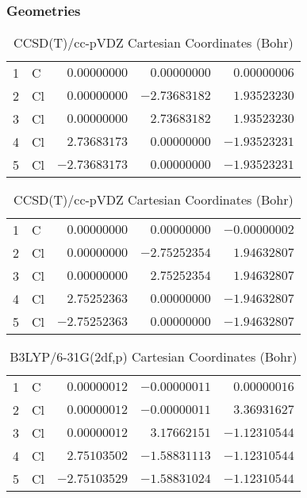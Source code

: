 \documentclass[10pt,oneside]{article}
\begin{document}
\clearpage

\subsection{}

\begin{table}[h!]
\subsubsection*{Geometries}
\begin{multicols}{2}
\centering
\caption{CCSD(T)/cc-pVTZ Cartesian Coordinates (Bohr)}
\begin{tabular}{llrrr}
\toprule
1  & C  & $ 0.00000000$ & $ 0.00000000$ & $ 0.00000006$ \\
2  & Cl & $ 0.00000000$ & $-2.73683182$ & $ 1.93523230$ \\
3  & Cl & $ 0.00000000$ & $ 2.73683182$ & $ 1.93523230$ \\
4  & Cl & $ 2.73683173$ & $ 0.00000000$ & $-1.93523231$ \\
5  & Cl & $-2.73683173$ & $ 0.00000000$ & $-1.93523231$ \\
\bottomrule
\end{tabular}
\caption{CCSD(T)/cc-pVDZ Cartesian Coordinates (Bohr)}
\begin{tabular}{llrrr}
\toprule
1  & C  & $ 0.00000000$ & $ 0.00000000$ & $-0.00000002$ \\
2  & Cl & $ 0.00000000$ & $-2.75252354$ & $ 1.94632807$ \\
3  & Cl & $ 0.00000000$ & $ 2.75252354$ & $ 1.94632807$ \\
4  & Cl & $ 2.75252363$ & $ 0.00000000$ & $-1.94632807$ \\
5  & Cl & $-2.75252363$ & $ 0.00000000$ & $-1.94632807$ \\
\bottomrule
\end{tabular}
\end{multicols}
\end{table}

\begin{table}[h]
\centering
\caption{B3LYP/6-31G(2df,p) Cartesian Coordinates (Bohr)}
\begin{tabular}{llrrr}
\toprule
1  & C  & $ 0.00000012$ & $-0.00000011$ & $ 0.00000016$ \\
2  & Cl & $ 0.00000012$ & $-0.00000011$ & $ 3.36931627$ \\
3  & Cl & $ 0.00000012$ & $ 3.17662151$ & $-1.12310544$ \\
4  & Cl & $ 2.75103502$ & $-1.58831113$ & $-1.12310544$ \\
5  & Cl & $-2.75103529$ & $-1.58831024$ & $-1.12310544$ \\
\bottomrule
\end{tabular}
\end{table}
\end{document}
